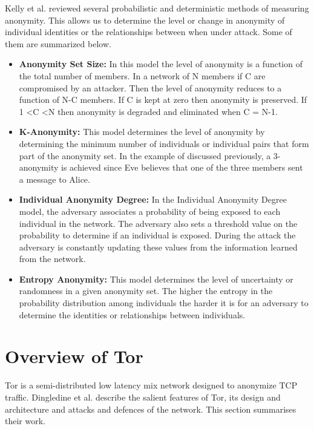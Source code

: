\documentclass{llncs}
\begin{document}
Kelly et al. \cite{kelly2012exploring} reviewed several probabilistic and deterministic methods of measuring anonymity. This allows us to determine the level or change in anonymity of individual identities or the relationships between when under attack. Some of them are summarized below. 
\begin{itemize}
	\item[]{\textbf{Anonymity Set Size:} In this model the level of anonymity is a function of the total number of members. In a network of N members if C are compromised by an attacker. Then the level of anonymity reduces to a function of N-C members. If C is kept at zero then anonymity is preserved. If 1 \textless C \textless N then anonymity is degraded and eliminated when C = N-1.}
	\item[]{\textbf{K-Anonymity:} This model determines the level of anonymity by determining the minimum number of individuals or individual pairs that form part of the anonymity set. In the example of discussed previously, a 3-anonymity is achieved since Eve believes that one of the three members sent a message to Alice.}
	\item[]{\textbf{Individual Anonymity Degree:} In the Individual Anonymity Degree model, the adversary associates a probability of being exposed to each individual in the network. The adversary also sets a threshold value on the probability to determine if an individual is exposed. During the attack the adversary is constantly updating these values from the information learned from the network.}
	\item[]{\textbf{Entropy Anonymity:} This model determines the level of uncertainty or randomness in a given anonymity set. The higher the entropy in the probability distribution among individuals the harder it is for an adversary to determine the identities or relationships between individuals.}
\end{itemize}

\section{Overview of Tor} \label{tor}
Tor is a semi-distributed low latency mix network designed to anonymize TCP traffic. Dingledine et al. \cite{tor-design} describe the salient features of Tor, its design and architecture and attacks and defences of the network. This section summarises their work.
\end{document}

